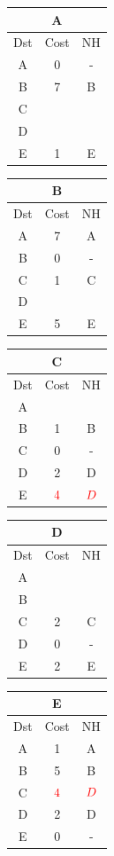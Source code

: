 \documentclass[10pt]{article}
\begin{document}
	\begin{table}[h!]
		\begin{tabular}{|c||c||c|}
 			\hline
	 		\multicolumn{3}{|c|}{A} \\
 			\hline
 			Dst & Cost & NH\\
 			\hline
 			A & 0 & - \\
 			B & 7 & B \\
 			C &   &   \\
 			D &   &   \\
 			E & 1 & E \\
 			\hline
		\end{tabular}
		\begin{tabular}{|c||c||c|}
 			\hline
	 		\multicolumn{3}{|c|}{B} \\
 			\hline
 			Dst & Cost & NH\\
 			\hline
 			A & 7 & A \\
 			B & 0 & - \\
 			C & 1 & C  \\
 			D &   &   \\
 			E & 5 & E \\
 			\hline
		\end{tabular}
		\begin{tabular}{|c||c||c|}
 			\hline
	 		\multicolumn{3}{|c|}{C} \\
 			\hline
 			Dst & Cost & NH\\
 			\hline
 			A &   &   \\
 			B & 1 & B \\
 			C & 0 & - \\
 			D & 2 & D \\
 			E & $\color{red} 4$  & $\color{red} D$ \\
 			\hline
		\end{tabular}
		\begin{tabular}{|c||c||c|}
 			\hline
	 		\multicolumn{3}{|c|}{D} \\
 			\hline
 			Dst & Cost & NH\\
 			\hline
 			A &   &   \\
 			B &   &   \\
 			C & 2 & C \\
 			D & 0 & - \\
 			E & 2 & E \\
 			\hline
		\end{tabular}
		\begin{tabular}{|c||c||c|}
 			\hline
	 		\multicolumn{3}{|c|}{E} \\
 			\hline
 			Dst & Cost & NH\\
 			\hline
 			A & 1 & A \\
 			B & 5 & B \\
 			C & $\color{red} 4$  & $\color{red} D$  \\
 			D & 2 & D \\
 			E & 0 & - \\
 			\hline
		\end{tabular}
	\end{table}
\end{document}
